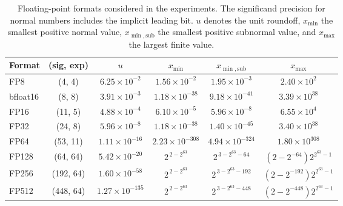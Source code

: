 \documentclass[a4paper,11pt]{article}
\begin{document}
\begin{table}[ht]
    \centering
    \caption{Floating-point formats considered in the experiments.
    The significand precision for normal numbers includes the implicit
    leading bit. $u$ denotes the unit roundoff, $x_{\min}$ the smallest
    positive normal value, $x_{\min,\mathrm{sub}}$ the smallest positive
    subnormal value, and $x_{\max}$ the largest finite value.}
    \label{tab:precisions}
    \begin{tabular}{lccccc}
        \toprule
        Format & (sig, exp) & $u$ & $x_{\min}$ & $x_{\min,\mathrm{sub}}$ & $x_{\max}$ \\
        \midrule
        FP8       & (4, 4)    & $6.25 \times 10^{-2}$
                  & $1.56 \times 10^{-2}$ & $1.95 \times 10^{-3}$
                  & $2.40 \times 10^{2}$ \\

        bfloat16  & (8, 8)    & $3.91 \times 10^{-3}$
                  & $1.18 \times 10^{-38}$ & $9.18 \times 10^{-41}$
                  & $3.39 \times 10^{38}$ \\

        FP16      & (11, 5)   & $4.88 \times 10^{-4}$
                  & $6.10 \times 10^{-5}$ & $5.96 \times 10^{-8}$
                  & $6.55 \times 10^{4}$ \\

        FP32      & (24, 8)   & $5.96 \times 10^{-8}$
                  & $1.18 \times 10^{-38}$ & $1.40 \times 10^{-45}$
                  & $3.40 \times 10^{38}$ \\

        FP64      & (53, 11)  & $1.11 \times 10^{-16}$
                  & $2.23 \times 10^{-308}$ & $4.94 \times 10^{-324}$
                  & $1.80 \times 10^{308}$ \\

        FP128     & (64, 64)  & $5.42 \times 10^{-20}$
                  & $2^{\,2-2^{63}}$
                  & $2^{\,3-2^{63}-64}$
                  & $(2-2^{-64})2^{2^{63}-1}$ \\

        FP256     & (192, 64) & $1.60 \times 10^{-58}$
                  & $2^{\,2-2^{63}}$
                  & $2^{\,3-2^{63}-192}$
                  & $(2-2^{-192})2^{2^{63}-1}$ \\

        FP512     & (448, 64) & $1.27 \times 10^{-135}$
                  & $2^{\,2-2^{63}}$
                  & $2^{\,3-2^{63}-448}$
                  & $(2-2^{-448})2^{2^{63}-1}$ \\


\end{tabular}
\end{table}
\end{document}
